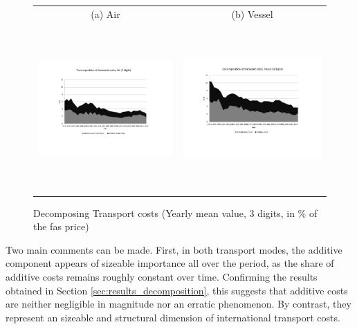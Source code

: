 \documentclass[a4paper,11pt]{article}
\begin{document}
\begin{figure}[htbp]
\caption{Decomposing Transport costs (Yearly mean value, 3 digits, in \% of the fas price)}
\label{fig:decomp_TC_3d}
\begin{center}
\begin{tabular}{cc}
{\small (a) Air } & {\small (b) Vessel}\\
\includegraphics[width=3in, height=2.5in]{Fig2a_decompTC_air_3d.pdf}
& \includegraphics[width=3in,height=2.5in]{Fig2b_decompTC_vessel_3d.pdf} \\
\end{tabular}
\end{center}
\end{figure}

Two main comments can be made. First, in both transport modes, the additive component appears of sizeable importance all over the period, as the share of additive costs remains roughly constant over time. Confirming the results obtained in Section \ref{sec:results_decomposition}, this suggests that additive costs are neither negligible in magnitude nor an erratic phenomenon. By contrast, they represent an sizeable and structural dimension of international transport costs.
\end{document}
